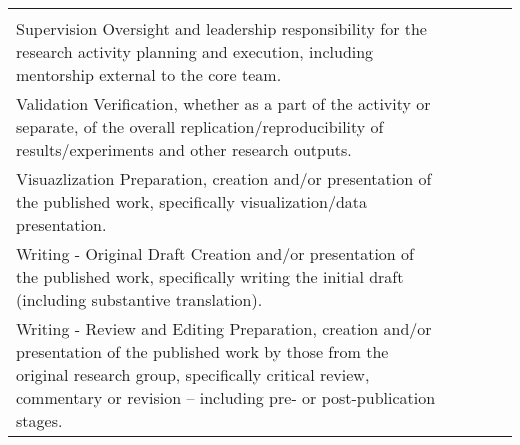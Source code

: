 \documentclass{article}
\begin{document}
\begin{table}
\begin{tabular}{p{8cm}lllp{4cm}}
    & 
    & 
    & \\
Supervision \newline
\footnotesize{Oversight and leadership responsibility for the research activity planning and execution, including mentorship external to the core team.}
    & 
    & 
    & \\
Validation \newline
\footnotesize{Verification, whether as a part of the activity or separate, of the overall replication/reproducibility of results/experiments and other research outputs.}
    & 
    & 
    & \\
Visuazlization \newline
\footnotesize{Preparation, creation and/or presentation of the published work, specifically visualization/data presentation.}
    & 
    & 
    & \\
Writing - Original Draft \newline
\footnotesize{Creation and/or presentation of the published work, specifically writing the initial draft (including substantive translation).}
    & 
    & 
    & \\
Writing - Review and Editing \newline
\footnotesize{Preparation, creation and/or presentation of the published work by those from the original research group, specifically critical review, commentary or revision – including pre- or post-publication stages.}
    & 
    & 
    & \\
\end{tabular}
\end{table}

\clearpage\newpage
\end{document}
